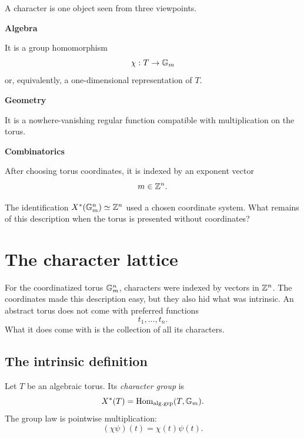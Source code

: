 \begin{threedictionaries}
A character is one object seen from three viewpoints.

\medskip

\noindent
\begin{minipage}[t]{0.30\linewidth}
\centering
\textbf{Algebra}\par
\smallskip
It is a group homomorphism
\[
\chi:T\to\mathbb{G}_{m}
\]
or, equivalently, a one-dimensional representation of \(T\).
\end{minipage}
\hfill
\begin{minipage}[t]{0.30\linewidth}
\centering
\textbf{Geometry}\par
\smallskip
It is a nowhere-vanishing regular function compatible with
multiplication on the torus.
\end{minipage}
\hfill
\begin{minipage}[t]{0.30\linewidth}
\centering
\textbf{Combinatorics}\par
\smallskip
After choosing torus coordinates, it is indexed by an exponent vector
\[
m\in\mathbb{Z}^n.
\]
\end{minipage}
\end{threedictionaries}

\begin{guidingquestion}
The identification \(X^*(\mathbb{G}_{m}^n)\simeq\mathbb{Z}^n\) used a chosen coordinate
system. What remains of this description when the torus is presented
without coordinates?
\end{guidingquestion}


\section{The character lattice}
\label{sec:character-lattice}

For the coordinatized torus \(\mathbb{G}_{m}^n\), characters were indexed by
vectors in \(\mathbb{Z}^n\). The coordinates made this description easy, but
they also hid what was intrinsic. An abstract torus does not come with
preferred functions
\[
t_1,\ldots,t_n.
\]
What it does come with is the collection of all its characters.

\subsection{The intrinsic definition}

\begin{definition}
Let \(T\) be an algebraic torus. Its \emph{character group} is
\[
X^*(T)
=
\operatorname{Hom}_{\mathrm{alg.grp}}(T,\mathbb{G}_{m}).
\]
The group law is pointwise multiplication:
\[
(\chi\psi)(t)=\chi(t)\psi(t).
\]
\end{definition}

